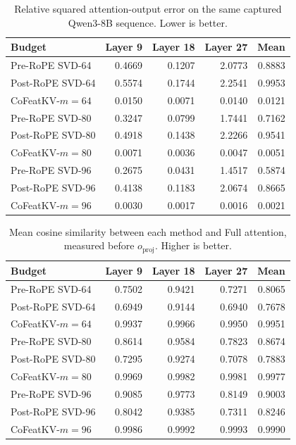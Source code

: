 \documentclass{article} %
\begin{document}
\begin{table}[H]
\centering
\caption{Relative squared attention-output error on the same captured
Qwen3-8B sequence. Lower is better.}
\label{tab:layer-error}
\small
\setlength{\tabcolsep}{4pt}
\begin{tabular}{lrrrr}
\toprule
Budget & Layer 9 & Layer 18 & Layer 27 & Mean \\
\midrule
Pre-RoPE SVD-64  & 0.4669 & 0.1207 & 2.0773 & 0.8883 \\
Post-RoPE SVD-64 & 0.5574 & 0.1744 & 2.2541 & 0.9953 \\
CoFeatKV-$m=64$  & 0.0150 & 0.0071 & 0.0140 & 0.0121 \\
Pre-RoPE SVD-80  & 0.3247 & 0.0799 & 1.7441 & 0.7162 \\
Post-RoPE SVD-80 & 0.4918 & 0.1438 & 2.2266 & 0.9541 \\
CoFeatKV-$m=80$  & 0.0071 & 0.0036 & 0.0047 & 0.0051 \\
Pre-RoPE SVD-96  & 0.2675 & 0.0431 & 1.4517 & 0.5874 \\
Post-RoPE SVD-96 & 0.4138 & 0.1183 & 2.0674 & 0.8665 \\
CoFeatKV-$m=96$  & 0.0030 & 0.0017 & 0.0016 & 0.0021 \\
\bottomrule
\end{tabular}
\end{table}

\begin{table}[H]
\centering
\caption{Mean cosine similarity between each method and Full attention,
measured before $o_{\mathrm{proj}}$. Higher is better.}
\label{tab:layer-cosine}
\small
\setlength{\tabcolsep}{4pt}
\begin{tabular}{lrrrr}
\toprule
Budget & Layer 9 & Layer 18 & Layer 27 & Mean \\
\midrule
Pre-RoPE SVD-64  & 0.7502 & 0.9421 & 0.7271 & 0.8065 \\
Post-RoPE SVD-64 & 0.6949 & 0.9144 & 0.6940 & 0.7678 \\
CoFeatKV-$m=64$  & 0.9937 & 0.9966 & 0.9950 & 0.9951 \\
Pre-RoPE SVD-80  & 0.8614 & 0.9584 & 0.7823 & 0.8674 \\
Post-RoPE SVD-80 & 0.7295 & 0.9274 & 0.7078 & 0.7883 \\
CoFeatKV-$m=80$  & 0.9969 & 0.9982 & 0.9981 & 0.9977 \\
Pre-RoPE SVD-96  & 0.9085 & 0.9773 & 0.8149 & 0.9003 \\
Post-RoPE SVD-96 & 0.8042 & 0.9385 & 0.7311 & 0.8246 \\
CoFeatKV-$m=96$  & 0.9986 & 0.9992 & 0.9993 & 0.9990 \\
\bottomrule
\end{tabular}
\end{table}
\end{document}
